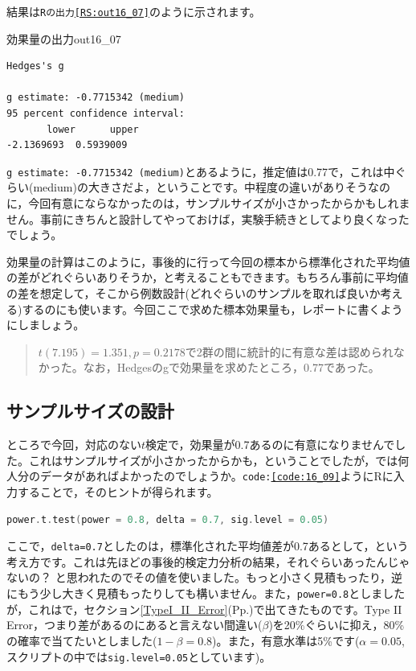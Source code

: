 \documentclass{ltjsbook}
\begin{document}
結果は\texttt{Rの出力\ref{RS:out16_07}}のように示されます。
\begin{Rscreen}{効果量の出力}{out16_07}
	\begin{verbatim}
Hedges's g

g estimate: -0.7715342 (medium)
95 percent confidence interval:
       lower      upper 
-2.1369693  0.5939009 
\end{verbatim}
\end{Rscreen}

\texttt{g estimate: -0.7715342 (medium)}とあるように，推定値は0.77で，これは中ぐらい(medium)の大きさだよ，ということです。中程度の違いがありそうなのに，今回有意にならなかったのは，サンプルサイズが小さかったからかもしれません。事前にきちんと設計してやっておけば，実験手続きとしてより良くなったでしょう。

効果量の計算はこのように，事後的に行って今回の標本から標準化された平均値の差がどれぐらいありそうか，と考えることもできます。もちろん事前に平均値の差を想定して，そこから例数設計(どれぐらいのサンプルを取れば良いか考える)するのにも使います。今回ここで求めた標本効果量も，レポートに書くようにしましょう。

\begin{quote}
	$t(7.195)=1.351,p = 0.2178$で2群の間に統計的に有意な差は認められなかった。なお，Hedgesのgで効果量を求めたところ，0.77であった。
\end{quote}

\subsection{サンプルサイズの設計}
ところで今回，対応のない$t$検定で，効果量が0.7あるのに有意になりませんでした。これはサンプルサイズが小さかったからかも，ということでしたが，では何人分のデータがあればよかったのでしょうか。\texttt{code:\ref{code:16_09}}ようにRに入力することで，そのヒントが得られます。
\begin{lstlisting}[language=c++,label={code:16_09},caption={power.t.test関数}]
power.t.test(power = 0.8, delta = 0.7, sig.level = 0.05)
\end{lstlisting}
ここで，\texttt{delta=0.7}としたのは，標準化された平均値差が0.7あるとして，という考え方です。これは先ほどの事後的検定力分析の結果，それぐらいあったんじゃないの？ と思われたのでその値を使いました。もっと小さく見積もったり，逆にもう少し大きく見積もったりしても構いません。また，\texttt{power=0.8}としましたが，これはで，セクション\ref{TypeI_II_Error}(Pp.\pageref{TypeI_II_Error})で出てきたものです。Type II Error，つまり差があるのにあると言えない間違い($\beta$)を20\%ぐらいに抑え，80\%の確率で当てたいとしました($1-\beta=0.8$)。また，有意水準は5\%です($\alpha=0.05$,スクリプトの中では\texttt{sig.level=0.05}としています)。
\end{document}
